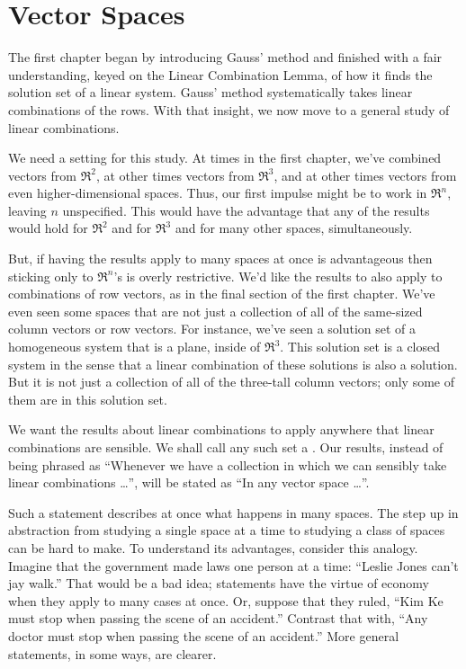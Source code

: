 \chapter{Vector Spaces}
The first chapter began by introducing Gauss' method and finished with a fair
understanding, keyed on the Linear Combination Lemma, 
of how it finds the solution set of a linear system.
Gauss' method systematically takes linear combinations of the rows.
With that insight, we now move to a general study of linear 
combinations.

We need a setting for this study.
At times in the first chapter, we've combined vectors from $\Re^2$, 
at other times vectors from $\Re^3$,
and at other times vectors from even higher-dimensional spaces. 
Thus, our first impulse might be 
to work in $\Re^n$, leaving $n$ unspecified.
This would have the advantage that any of the results 
would hold for $\Re^2$ and for $\Re^3$ and for many other spaces,
simultaneously.

But, if having the results apply to many spaces at once is
advantageous then sticking only to $\Re^n$'s is overly restrictive. 
We'd like the results to also apply to combinations of row vectors,
as in the final section of the first chapter.
We've even seen some spaces that are not just a collection of all of the
same-sized column vectors or row vectors.
For instance, we've seen a solution
set of a homogeneous system that is a plane, inside of $\Re^3$.
This solution set is a closed system in the sense that 
a linear combination of these solutions is also a solution. 
But it is not just a collection of all of the three-tall column vectors; 
only some of them are in this solution set.

We want the results about linear combinations to apply anywhere that linear
combinations are sensible. 
We shall call any such set a .
Our results, instead of being phrased as
``Whenever we have a collection in which we can sensibly take linear 
combinations \ldots'', will be stated as
``In any vector space \ldots''.

Such a statement describes at once what
happens in many spaces.
The step up in abstraction from studying a single space at a time 
to studying a class of spaces can be hard to make.
To understand its advantages, consider this analogy.
Imagine that the government made laws one person at a time:
``Leslie Jones can't jay walk.''
That would be a bad idea; 
statements have the virtue of economy when they apply to many cases at once.
Or, suppose that they ruled, ``Kim Ke must stop when passing 
the scene of an accident.''
Contrast that with, ``Any doctor must stop when passing 
the scene of an accident.''
More general statements, in some ways, are clearer.













